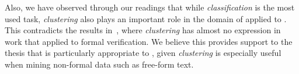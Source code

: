 Also, we have observed through our readings that while \emph{classification} is
the most used \ML task, \emph{clustering} also plays an important role in the
domain of \ML applied to \RE. This contradicts the results
in~\cite{AmLuBi:2018}, where \emph{clustering} has almost no expression in work
that applied \ML to formal verification. We believe this provides support to the
thesis that \ML is particularly appropriate to \RE, given \emph{clustering} is
especially useful when mining non-formal data such as free-form text.



